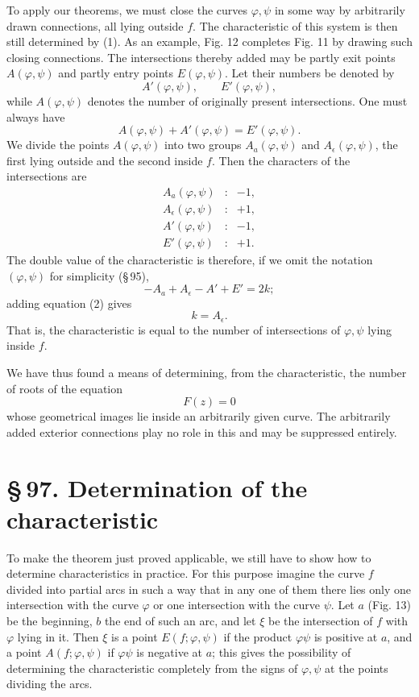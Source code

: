 \documentclass[11pt]{article}
\providecommand{\sect}[2]{\section*{\S\,#1. #2}}
\begin{document}
To apply our theorems, we must close the curves $\varphi,\psi$ in some way by arbitrarily drawn connections, all lying outside $f$. The characteristic of this system is then still determined by (1). As an example, Fig. 12 completes Fig. 11 by drawing such closing connections. The intersections thereby added may be partly exit points $A(\varphi,\psi)$ and partly entry points $E(\varphi,\psi)$. Let their numbers be denoted by
\[
        A'(\varphi,\psi),\qquad E'(\varphi,\psi),
\]
while $A(\varphi,\psi)$ denotes the number of originally present intersections. One must always have
\begin{equation}
        A(\varphi,\psi)+A'(\varphi,\psi)=E'(\varphi,\psi).
\tag{2}
\end{equation}
We divide the points $A(\varphi,\psi)$ into two groups $A_a(\varphi,\psi)$ and $A_\epsilon(\varphi,\psi)$, the first lying outside and the second inside $f$. Then the characters of the intersections are
\[
\begin{array}{rcl}
A_a(\varphi,\psi)&:&-1,\\
A_\epsilon(\varphi,\psi)&:&+1,\\
A'(\varphi,\psi)&:&-1,\\
E'(\varphi,\psi)&:&+1.
\end{array}
\]
The double value of the characteristic is therefore, if we omit the notation $(\varphi,\psi)$ for simplicity (\S\,95),
\begin{equation}
        -A_a+A_\epsilon-A'+E'=2k;
\tag{3}
\end{equation}
adding equation (2) gives
\begin{equation}
        k=A_\epsilon.
\tag{4}
\end{equation}
That is, the characteristic is equal to the number of intersections of $\varphi,\psi$ lying inside $f$.

We have thus found a means of determining, from the characteristic, the number of roots of the equation
\[
        F(z)=0
\]
whose geometrical images lie inside an arbitrarily given curve. The arbitrarily added exterior connections play no role in this and may be suppressed entirely.

\sect{97}{Determination of the characteristic}

To make the theorem just proved applicable, we still have to show how to determine characteristics in practice. For this purpose imagine the curve $f$ divided into partial arcs in such a way that in any one of them there lies only one intersection with the curve $\varphi$ or one intersection with the curve $\psi$. Let $a$ (Fig. 13) be the beginning, $b$ the end of such an arc, and let $\xi$ be the intersection of $f$ with $\varphi$ lying in it. Then $\xi$ is a point $E(f;\varphi,\psi)$ if the product $\varphi\psi$ is positive at $a$, and a point $A(f;\varphi,\psi)$ if $\varphi\psi$ is negative at $a$; this gives the possibility of determining the characteristic completely from the signs of $\varphi,\psi$ at the points dividing the arcs.
\end{document}
